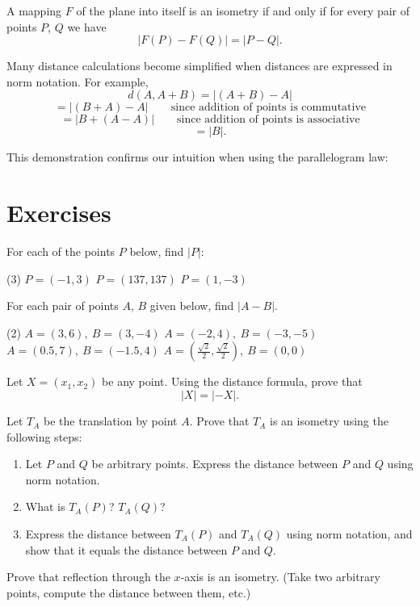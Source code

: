 \documentclass[12pt]{book} %
\begin{document}
\begin{ExerciseList}
A mapping $F$ of the plane into itself is an isometry if and only if for every pair of points $P$, $Q$ we have
\[
|F(P)-F(Q)|=|P-Q|.
\]

Many distance calculations become simplified when distances are expressed in norm notation. For example,
\[
d(A,A+B)=|(A+B)-A|
\]
\[
=|(B+A)-A| \qquad \text{since addition of points is commutative}
\]
\[
=|B+(A-A)| \qquad \text{since addition of points is associative}
\]
\[
=|B|.
\]

This demonstration confirms our intuition when using the parallelogram law:


\section*{Exercises}

\setcounter{Exercise}{0}
\begin{ExerciseList}
\Exercise For each of the points $P$ below, find $|P|$:
\begin{tasks}(3)
\task[(a)] $P=(-1,3)$
\task[(b)] $P=(137,137)$
\task[(c)] $P=(1,-3)$
\end{tasks}

\Exercise For each pair of points $A$, $B$ given below, find $|A-B|$.
\begin{tasks}(2)
\task[(a)] $A=(3,6),\ B=(3,-4)$
\task[(b)] $A=(-2,4),\ B=(-3,-5)$
\task[(c)] $A=(0.5,7),\ B=(-1.5,4)$
\task[(d)] $A=\left(\frac{\sqrt2}{2},\frac{\sqrt2}{2}\right),\ B=(0,0)$
\end{tasks}

\Exercise Let $X=(x_1,x_2)$ be any point. Using the distance formula, prove that
\[
|X|=|-X|.
\]

\Exercise Let $T_A$ be the translation by point $A$. Prove that $T_A$ is an isometry using the following steps:
\begin{enumerate}
\item[(a)] Let $P$ and $Q$ be arbitrary points. Express the distance between $P$ and $Q$ using norm notation.
\item[(b)] What is $T_A(P)$? $T_A(Q)$?
\item[(c)] Express the distance between $T_A(P)$ and $T_A(Q)$ using norm notation, and show that it equals the distance between $P$ and $Q$.
\end{enumerate}

\Exercise Prove that reflection through the $x$-axis is an isometry. (Take two arbitrary points, compute the distance between them, etc.)


\end{ExerciseList}
\end{ExerciseList}
\end{document}
